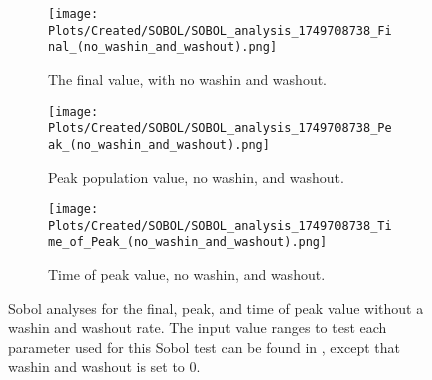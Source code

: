 \begin{figure}[ht!]
    \centering
    \begin{subfigure}{0.32\linewidth}
        \centering
        \captionsetup{width=1\linewidth}
        \texttt{[image: Plots/Created/SOBOL/SOBOL\_analysis\_1749708738\_Final\_(no\_washin\_and\_washout).png]}
        \caption{
            The final value, with no washin and washout. 
        }
        \label{fig:created:Sobol_final_no_wi_wo}
    \end{subfigure}
    \hfill
    \begin{subfigure}{0.32\linewidth}
        \centering
        \captionsetup{width=1\linewidth}
        \texttt{[image: Plots/Created/SOBOL/SOBOL\_analysis\_1749708738\_Peak\_(no\_washin\_and\_washout).png]}
        \caption{
            Peak population value, no washin, and washout. 
        }
        \label{fig:created:Sobol_peak_no_wi_wo}
    \end{subfigure}
    \hfill
    \begin{subfigure}{0.32\linewidth}
        \centering
        \captionsetup{width=1\linewidth}
        \texttt{[image: Plots/Created/SOBOL/SOBOL\_analysis\_1749708738\_Time\_of\_Peak\_(no\_washin\_and\_washout).png]}
        \caption{
            Time of peak value, no washin, and washout. 
        }
        \label{fig:created:Sobol_peak_time_no_wi_wo}
    \end{subfigure}
    \caption{
        Sobol analyses for the final, peak, and time of peak value without a washin and washout rate.
        The input value ranges to test each parameter used for this Sobol test can be found in , except that washin and washout is set to 0. 
    }
    \label{fig:created:Sobol_no_wi_wo}
\end{figure}

